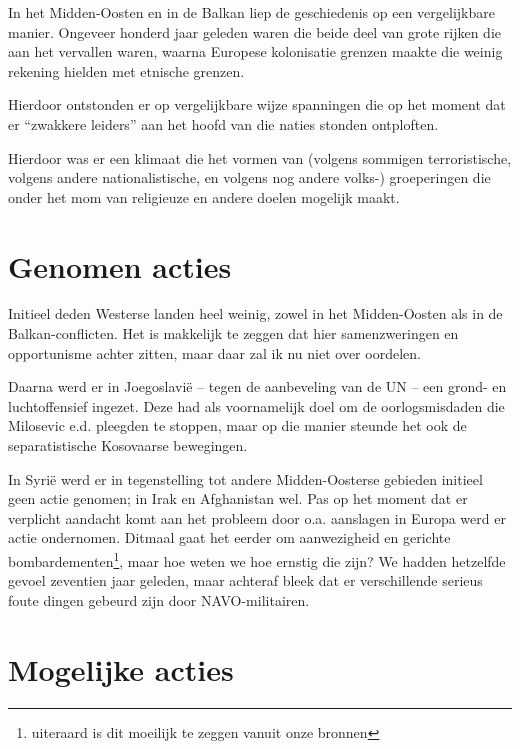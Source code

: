 \documentclass[a4paper]{article}
\begin{document}
In het Midden-Oosten en in de Balkan liep de geschiedenis op een vergelijkbare manier. Ongeveer honderd jaar geleden waren die beide deel van grote rijken die aan het vervallen waren, waarna Europese kolonisatie grenzen maakte die weinig rekening hielden met etnische grenzen.

Hierdoor ontstonden er op vergelijkbare wijze spanningen die op het moment dat er ``zwakkere leiders'' aan het hoofd van die naties stonden ontploften.

Hierdoor was er een klimaat die het vormen van (volgens sommigen terroristische, volgens andere nationalistische, en volgens nog andere volks-) groeperingen die onder het mom van religieuze en andere doelen mogelijk maakt.


\section{Genomen acties} %

\label{sec:genomen_acties}
Initieel deden Westerse landen heel weinig, zowel in het Midden-Oosten als in de Balkan-conflicten. Het is makkelijk te zeggen dat hier samenzweringen en opportunisme achter zitten, maar daar zal ik nu niet over oordelen.

Daarna werd er in Joegoslavië -- tegen de aanbeveling van de UN -- een grond- en luchtoffensief ingezet. Deze had als voornamelijk doel om de oorlogsmisdaden die Milosevic e.d. pleegden te stoppen, maar op die manier steunde het ook de separatistische Kosovaarse bewegingen.

In Syrië werd er in tegenstelling tot andere Midden-Oosterse gebieden initieel geen actie genomen; in Irak en Afghanistan wel. Pas op het moment dat er verplicht aandacht komt aan het probleem door o.a. aanslagen in Europa werd er actie ondernomen. Ditmaal gaat het eerder om aanwezigheid en gerichte bombardementen\footnote{uiteraard is dit moeilijk te zeggen vanuit onze bronnen}, maar hoe weten we hoe ernstig die zijn? We hadden hetzelfde gevoel zeventien jaar geleden, maar achteraf bleek dat er verschillende serieus foute dingen gebeurd zijn door NAVO-militairen.


\section{Mogelijke acties} %
\label{sec:mogelijke_acties}
\end{document}
